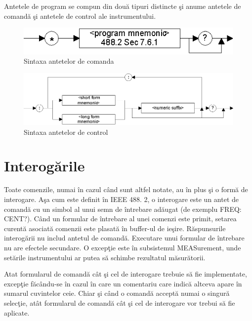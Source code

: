 Antetele de program se compun din dou\u{a} tipuri distincte \c{s}i anume antetele de comand\u{a} \c{s}i antetele de control ale instrumentului.

\begin{figure}[htp]
 \centering
 \includegraphics[scale=1]{Figuri/scpi_ro_1.eps}
 \caption{Sintaxa antetelor de comanda}
 \label{fig6}
\end{figure}

\begin{figure}[htp]
 \centering
 \includegraphics[scale=1]{Figuri/scpi_ro_2.eps}
 \caption{Sintaxa antetelor de control}
 \label{fig6}
\end{figure}

\section{Interog\u{a}rile}
Toate comenzile, numai \^{i}n cazul c\^{a}nd sunt altfel notate, au \^{i}n plus \c{s}i o form\u{a} de interogare. A\c{s}a cum este definit \^{i}n IEEE 488. 2, o interogare este un antet de comand\u{a} cu un simbol al unui semn de \^{i}ntrebare ad\u{a}ugat (de exemplu FREQ: CENT?). C\^{a}nd un formular de \^{i}ntrebare al unei comenzi este primit, setarea curent\u{a} asociat\u{a} comenzii este plasat\u{a} \^{i}n buffer-ul de ie\c{s}ire. R\u{a}spunsurile interog\u{a}rii nu includ antetul de comand\u{a}. Executare unui formular de \^{i}ntrebare nu are efectele secundare. O excep\c{t}ie este \^{i}n subsistemul MEASurement, unde set\u{a}rile instrumentului ar putea s\u{a} schimbe rezultatul m\u{a}sur\u{a}torii.

Atat formularul de comand\u{a} c\^{a}t \c{s}i cel de interogare trebuie s\u{a} fie implementate, excep\c{t}ie f\u{a}c\^{a}ndu-se \^{i}n cazul \^{i}n care un comentariu care indic\u{a} altceva apare \^{i}n sumarul cuvintelor ceie. Chiar \c{s}i c\^{a}nd o comand\u{a} accept\u{a} numai o singur\u{a} selec\c{t}ie, at\^{a}t formularul de comand\u{a} c\^{a}t \c{s}i cel de interogare vor trebui s\u{a} fie aplicate.

